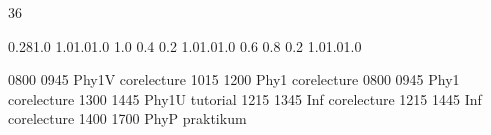 \documentclass[10pt]{article}
\begin{document}
\thispagestyle{empty}
\begin{landscape}
\noindent{}

\setslotsize{2.8cm}{0.3cm}
 {36}
\settextframe{0.8mm}



 {0.28}{1.0} {1.0}{1.0}{1.0}
    {1.0} {0.4} {0.2} {1.0}{1.0}{1.0}
   {0.6} {0.8} {0.2} {1.0}{1.0}{1.0}

\begin{timetable}
   {0800} {0945} {Phy1V}  {}  {}  {corelecture}
   {1015} {1200} {Phy1}  {}  {}  {corelecture}
   {0800} {0945} {Phy1}  {}  {}  {corelecture}
   {1300} {1445} {Phy1U}  {}  {}  {tutorial}
   {1215} {1345} {Inf}  {}  {}  {corelecture}
   {1215} {1445} {Inf}  {}  {}  {corelecture}
   {1400} {1700} {PhyP}  {}  {}  {praktikum}





\end{timetable}
\end{landscape}
\end{document}
